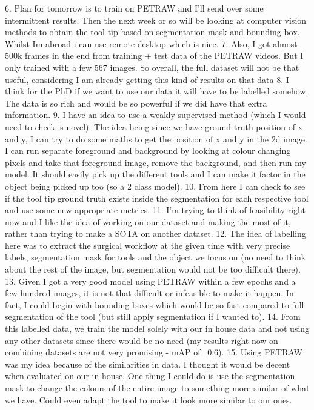 6.	Plan for tomorrow is to train on PETRAW and I'll send over some intermittent results. Then the next week or so will be looking at computer vision methods to obtain the tool tip based on segmentation mask and bounding box. Whilst Im abroad i can use remote desktop which is nice.
7.	Also, I got almost 500k frames in the end from training + test data of the PETRAW videos. But I only trained with a few 567 images. So overall, the full dataset will not be that useful, considering I am already getting this kind of results on that data
8.	I think for the PhD if we want to use our data it will have to be labelled somehow. The data is so rich and would be so powerful if we did have that extra information. 
9.	I have an idea to use a weakly-supervised method (which I would need to check is novel). The idea being since we have ground truth position of x and y, I can try to do some maths to get the position of x and y in the 2d image. I can run separate foreground and background by looking at colour changing pixels and take that foreground image, remove the background, and then run my model. It should easily pick up the different tools and I can make it factor in the object being picked up too (so a 2 class model). 
10.	From here I can check to see if the tool tip ground truth exists inside the segmentation for each respective tool and use some new appropriate metrics.
11.	I’m trying to think of feasibility right now and I like the idea of working on our dataset and making the most of it, rather than trying to make a SOTA on another dataset.
12.	The idea of labelling here was to extract the surgical workflow at the given time with very precise labels, segmentation mask for tools and the object we focus on (no need to think about the rest of the image, but segmentation would not be too difficult there). 
13.	Given I got a very good model using PETRAW within a few epochs and a few hundred images, it is not that difficult or infeasible to make it happen. In fact, I could begin with bounding boxes which would be so fast compared to full segmentation of the tool (but still apply segmentation if I wanted to). 
14.	From this labelled data, we train the model solely with our in house data and not using any other datasets since there would be no need (my results right now on combining datasets are not very promising - mAP of ~0.6). 
15.	Using PETRAW was my idea because of the similarities in data. I thought it would be decent when evaluated on our in house. One thing I could do is use the segmentation mask to change the colours of the entire image to something more similar of what we have. Could even adapt the tool to make it look more similar to our ones.
